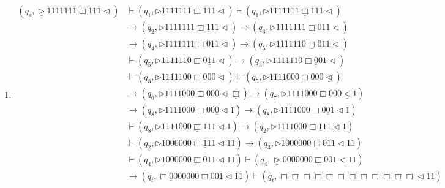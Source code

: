 \documentclass[12pt,a4paper]{article}
\makeatletter
\newtheorem*{solution}{Solution}
\theoremstyle{definition}
\renewenvironment{solution}[1][Solution] {\par\pushQED{\qed}\normalfont\topsep6\p@\@plus6\p@\relax\trivlist\item[\hskip\labelsep\bfseries#1\@addpunct{.}]\ignorespaces}{\popQED\endtrivlist\@endpefalse} \makeatother
\makeatother
\begin{document}
\begin{enumerate}
\begin{enumerate}
	\begin{solution}
		\begin{align*}
			(q_s,\underline{\triangleright}  1  1  1  1  1  1  1  \Box 1  1  1   \triangleleft)
			&\vdash (q_1,\triangleright  \underline{1}  1  1  1  1  1  1  \Box 1  1  1   \triangleleft) \vdash (q_1,\triangleright  1  1  1  1  1  1  1  \underline{\Box} 1  1  1   \triangleleft)\\
			&\rightarrow (q_2,\triangleright  1  1  1  1  1  1  1  \Box \underline{1}  1  1   \triangleleft)\rightarrow (q_3,\triangleright  1  1  1  1  1  1  1  \underline{\Box} 0  1  1   \triangleleft)\\
			&\rightarrow (q_4,\triangleright  1  1  1  1  1  1  \underline{1}  \Box 0  1  1   \triangleleft)\rightarrow (q_5,\triangleright  1  1  1  1  1  1  0  \underline{\Box} 0  1  1   \triangleleft)\\
			&\vdash (q_5,\triangleright  1  1  1  1  1  1  0  \Box 0  \underline{1}  1   \triangleleft)\rightarrow (q_3,\triangleright  1  1  1  1  1  1  0  \Box \underline{0}  0  1   \triangleleft)\\
			&\vdash (q_3,\triangleright  1  1  1  1  1  0  0  \Box 0  \underline{0}  0  \triangleleft)\vdash (q_5,\triangleright  1  1  1  1  0  0  0  \Box 0  0  0  \underline{\triangleleft})\\
			&\rightarrow (q_6,\triangleright  1  1  1  1  0  0  0  \Box 0  0  0 \triangleleft \underline{\Box})\rightarrow (q_7,\triangleright  1  1  1  1  0  0  0  \Box 0  0  0 \underline{\triangleleft} 1)\\
			&\rightarrow (q_8,\triangleright  1  1  1  1  0  0  0  \Box 0  0  \underline{0} \triangleleft 1)\rightarrow (q_8,\triangleright  1  1  1  1  0  0  0  \Box 0  \underline{0}  1 \triangleleft 1)\\
			&\vdash (q_8,\triangleright  1  1  1  1  0  0  0  \underline{\Box}  1  1 1 \triangleleft 1) \rightarrow (q_2,\triangleright  1  1  1  1  0  0  0  \Box  \underline{1} 1 1 \triangleleft 1)\\ 
			&\vdash (q_2,\triangleright  1  0  0  0  0  0  0  \Box \underline{1}  1  1 \triangleleft 1 1)\rightarrow (q_3,\triangleright  1  0  0  0  0  0  0  \underline{\Box} 0  1  1 \triangleleft 1 1)\\
			&\vdash (q_4,\triangleright  \underline{1}  0  0  0  0  0  0  \Box 0  1  1 \triangleleft 1 1)\vdash (q_4,\underline{\triangleright}  0  0  0  0  0  0  0  \Box 0  0  1 \triangleleft 1 1)\\
			&\rightarrow (q_t,\Box  \underline{0}  0  0  0  0  0  0  \Box 0  0  1 \triangleleft 1 1) \vdash (q_t,\Box  \Box  \Box  \Box  \Box  \Box  \Box  \Box  \Box \Box  \Box  \Box \underline{\triangleleft} 1 1)\\

\end{align*}
\end{solution}
\end{enumerate}
\end{enumerate}
\end{document}

